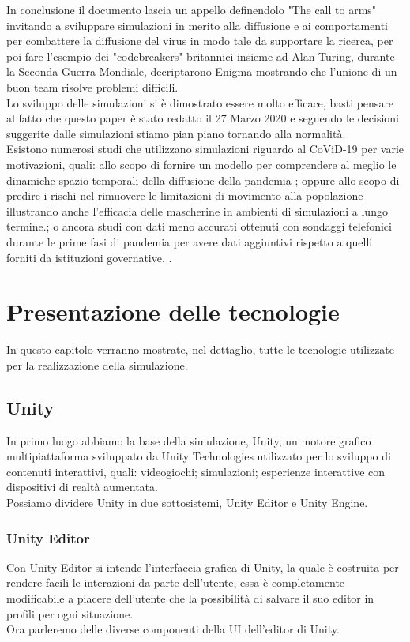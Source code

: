 \documentclass[12pt, openany]{book}
\begin{document}
	In conclusione il documento lascia un appello definendolo "The call to arms" invitando a sviluppare simulazioni in merito alla diffusione e ai comportamenti per combattere la diffusione del virus in modo tale da supportare la ricerca, per poi fare l'esempio dei "codebreakers" britannici insieme ad Alan Turing, durante la Seconda Guerra Mondiale, decriptarono Enigma mostrando che l'unione di un buon team risolve problemi difficili.\\
	Lo sviluppo delle simulazioni si è dimostrato essere molto efficace, basti pensare al fatto che questo paper è stato redatto il 27 Marzo 2020 e seguendo le decisioni suggerite dalle simulazioni stiamo pian piano tornando alla normalità.\\
	
	Esistono numerosi studi che utilizzano simulazioni riguardo al CoViD-19 per varie motivazioni, quali: allo scopo di fornire un modello per comprendere al meglio le dinamiche spazio-temporali della diffusione della pandemia
	 \cite{Singapore}; oppure allo scopo di predire i rischi nel rimuovere le limitazioni di movimento alla popolazione illustrando anche l'efficacia delle mascherine in ambienti di simulazioni a lungo termine.\cite{Madrid}; o ancora studi con dati meno accurati ottenuti con sondaggi telefonici durante le prime fasi di pandemia per avere dati aggiuntivi rispetto a quelli forniti da istituzioni governative. \cite{HongKong}.
	\chapter{Presentazione delle tecnologie}
	In questo capitolo verranno mostrate, nel dettaglio, tutte le tecnologie utilizzate per la realizzazione della simulazione.
	\section{Unity}
	In primo luogo abbiamo la base della simulazione, Unity\cite{Unity}, un motore grafico multipiattaforma sviluppato da Unity Technologies utilizzato per lo sviluppo di contenuti interattivi, quali: videogiochi; simulazioni; esperienze interattive con dispositivi di realtà aumentata. \\
	Possiamo dividere Unity in due sottosistemi, Unity Editor e Unity Engine. 
	\subsection{Unity Editor}
	Con Unity Editor si intende l'interfaccia grafica di Unity, la quale è costruita per rendere facili le interazioni da parte dell'utente, essa è completamente modificabile a piacere dell'utente che la possibilità di salvare il suo editor in profili per ogni situazione.\\
	Ora parleremo delle diverse componenti della UI dell'editor di Unity.
\end{document}
